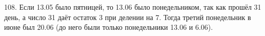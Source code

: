 108. Если 13.05 было пятницей, то 13.06 было понедельником, так как прошёл 31 день, а число 31 даёт остаток 3 при делении на 7. Тогда третий понедельник в июне был 20.06 (до него были только понедельники 13.06 и 6.06).\\

